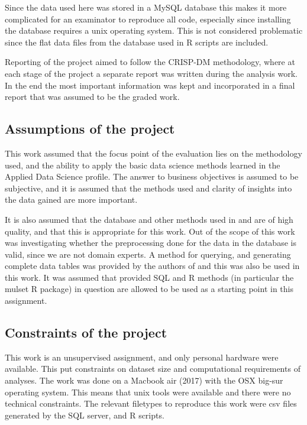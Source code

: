 Since the data used here was stored in a MySQL database this makes it more complicated for an examinator to reproduce all code, especially since installing the database
requires a unix operating system.
This is not considered problematic since the flat data files from the database used in R scripts are included.

Reporting of the project aimed to follow the CRISP-DM methodology, where at each stage of the project a separate report was written during the analysis work.
In the end the most important information was kept and incorporated in a final report that was assumed to be the graded work.

\subsection{Assumptions of the project}

This work assumed that the focus point of the evaluation lies on the methodology used, and the ability to apply the basic data science methods learned in the Applied Data Science profile.
The answer to business objectives is assumed to be subjective, and it is assumed that the methods used and clarity of insights into the data gained are more important.

It is also assumed that the \flup database and other methods used in \dpaper and \spaper are of high quality, and that this is appropriate for this work.
Out of the scope of this work was investigating whether the preprocessing done for the data in the database is valid, since we are not domain experts.
A method for querying, and generating complete data tables was provided by the authors of \dpaper and this was also be used in this work.
It was assumed that provided SQL and R methods (in particular the mulset R package) in question are allowed to be used as a starting point in this assignment.

\subsection{Constraints of the project}

This work is an unsupervised assignment, and only personal hardware were available.
This put constraints on dataset size and computational requirements of analyses. The work was done on a Macbook air (2017) with the OSX big-sur operating system.
This means that unix tools were available and there were no technical constraints.
The relevant filetypes to reproduce this work were csv files generated by the SQL server, and R scripts.

